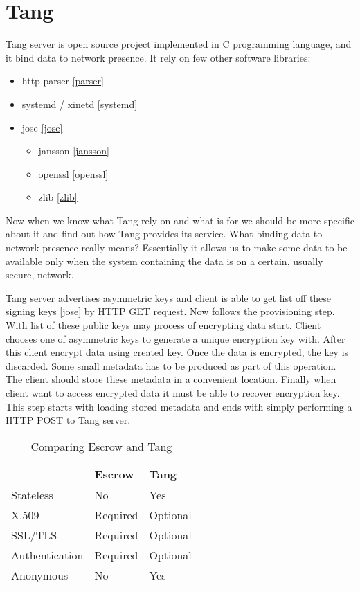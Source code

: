 \documentclass[../xdudla00-porting-Tang-to-Open-WRT.tex]{subfiles}
\begin{document}
\chapter{Tang}\label{tang}
Tang server is open source project implemented in C programming language, and it bind data to network presence.
It rely on few other software libraries:

\begin{itemize}
\item http-parser \ref{parser}
\item systemd / xinetd \ref{systemd}
\item jose \ref{jose}
    \begin{itemize}
    \item jansson \ref{jansson}
    \item openssl \ref{openssl}
    \item zlib \ref{zlib}
    \end{itemize}
\end{itemize}

Now when we know what Tang rely on and what is for we should be more specific about it and find out how Tang provides its service.
What binding data to network presence really means? Essentially it allows us to make some data to be available only when the system containing the data is on a certain, usually secure, network.

Tang server advertises asymmetric keys and client is able to get list off these signing keys \ref{jose} by HTTP GET request.
Now follows the provisioning step. With list of these public keys may process of encrypting data start. Client chooses one of asymmetric keys to generate a unique encryption key with.
After this client encrypt data using created key. Once the data is encrypted, the key is discarded.
Some small metadata has to be produced as part of this operation. The client should store these metadata in a convenient location.
Finally when client want to access encrypted data it must be able to recover encryption key.
This step starts with loading stored metadata and ends with simply performing a HTTP POST to Tang server.

\begin{table}[h]
\centering
\label{compare}
\begin{tabular}{@{}lll@{}}
\toprule
               & Escrow   & Tang                         \\ \midrule
Stateless      & No       & Yes                          \\
X.509          & Required & Optional                     \\
SSL/TLS        & Required & Optional                     \\
Authentication & Required & Optional                     \\
Anonymous      & No       & Yes                          \\ \bottomrule
\end{tabular}
\caption{Comparing Escrow and Tang}
\end{table}
\end{document}
